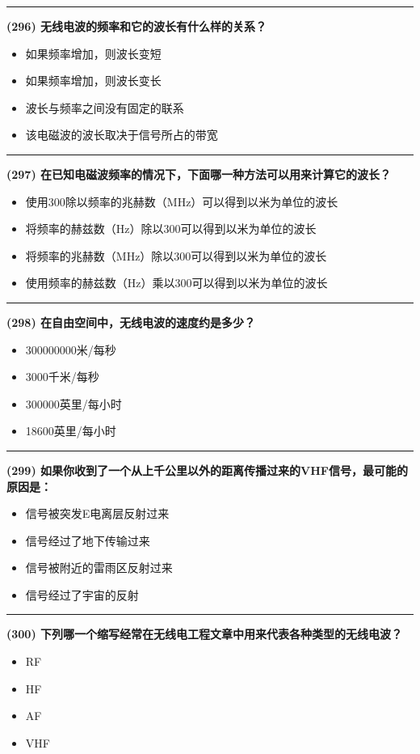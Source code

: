 \documentclass[twocolumn]{ctexart}  %
\begin{document}
\noindent\rule{0.5\textwidth}{1pt}
\heiti \textbf{(296) 无线电波的频率和它的波长有什么样的关系？} \songti {\color{gray} [LK1110] }
\begin{itemize}
	\item  如果频率增加，则波长变短
	\item  如果频率增加，则波长变长
	\item  波长与频率之间没有固定的联系
	\item  该电磁波的波长取决于信号所占的带宽
\end{itemize}


\noindent\rule{0.5\textwidth}{1pt}
\heiti \textbf{(297) 在已知电磁波频率的情况下，下面哪一种方法可以用来计算它的波长？} \songti {\color{gray} [LK1111] }
\begin{itemize}
	\item  使用300除以频率的兆赫数（MHz）可以得到以米为单位的波长
	\item  将频率的赫兹数（Hz）除以300可以得到以米为单位的波长
	\item  将频率的兆赫数（MHz）除以300可以得到以米为单位的波长
	\item  使用频率的赫兹数（Hz）乘以300可以得到以米为单位的波长
\end{itemize}


\noindent\rule{0.5\textwidth}{1pt}
\heiti \textbf{(298) 在自由空间中，无线电波的速度约是多少？} \songti {\color{gray} [LK1115] }
\begin{itemize}
	\item  300000000米/每秒
	\item  3000千米/每秒
	\item  300000英里/每小时
	\item  18600英里/每小时
\end{itemize}


\noindent\rule{0.5\textwidth}{1pt}
\heiti \textbf{(299) 如果你收到了一个从上千公里以外的距离传播过来的VHF信号，最可能的原因是：} \songti {\color{gray} [LK1116] }
\begin{itemize}
	\item  信号被突发E电离层反射过来
	\item  信号经过了地下传输过来
	\item  信号被附近的雷雨区反射过来
	\item  信号经过了宇宙的反射
\end{itemize}


\noindent\rule{0.5\textwidth}{1pt}
\heiti \textbf{(300) 下列哪一个缩写经常在无线电工程文章中用来代表各种类型的无线电波？} \songti {\color{gray} [LK1143] }
\begin{itemize}
	\item  RF
	\item  HF
	\item  AF
	\item  VHF
\end{itemize}
\end{document}
